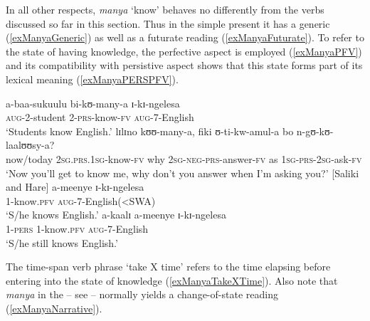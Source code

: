 In all other respects, \textit{manya} \lq know' behaves no differently from the verbs discussed so far in this section. Thus in the simple present it has a generic (\ref{exManyaGeneric}) as well as a futurate reading (\ref{exManyaFuturate}). To refer to the state of having knowledge, the perfective aspect is employed (\ref{exManyaPFV}) and its compatibility with persistive aspect shows that this state forms part of its lexical meaning (\ref{exManyaPERSPFV}).

\begin{exe}
\ex \label{exManyaGeneric}
\gll a-baa-sukuulu bi-kʊ-many-a ɪ-kɪ-ngelesa\\
\textsc{aug}-2-student 2-\textsc{prs}-know-\textsc{fv} \textsc{aug}-7-English\\
\glt \lq Students know English.'
\ex \label{exManyaFuturate}
\gll lɪlɪno kʊʊ-many-a, fiki ʊ-ti-kw-amul-a bo n-gʊ-kʊ-laalʊʊsy-a?\\
now/today \textsc{2sg.prs.1sg}-know-\textsc{fv} why \textsc{2sg}-\textsc{neg}-\textsc{prs}-answer-\textsc{fv} as \textsc{1sg}-\textsc{prs}-\textsc{2sg}-ask-\textsc{fv}\\
\glt \lq Now you'll get to know me, why don't you answer when I'm asking you?' [Saliki and Hare]
\ex \label{exManyaPFV} \gll a-meenye ɪ-kɪ-ngelesa\\
1-know.\textsc{pfv} \textsc{aug}-7-English(<SWA)\\
\glt \lq S/he knows English.'
\ex \label{exManyaPERSPFV}\gll a-kaalɪ a-meenye ɪ-kɪ-ngelesa\\
1-\textsc{pers} 1-know.\textsc{pfv} \textsc{aug}-7-English\\
\glt \lq S/he still knows English.'
\end{exe}

The time-span verb phrase \lq take X time' refers to the time elapsing before entering into the state of knowledge (\ref{exManyaTakeXTime}). Also note that \textit{manya} in the  -- see  -- normally yields a change-of-state reading (\ref{exManyaNarrative}).

